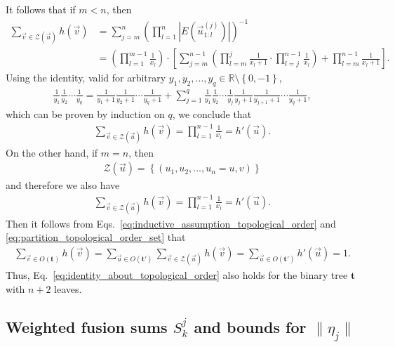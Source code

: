 \documentclass[superscriptaddress,onecolumn,nofootinbib,longbibliography,a4paper,accepted=2026-09-29]{quantumarticle}
\theoremstyle{plain}
\theoremstyle{definition}
\numberwithin{thm}{section}
\numberwithin{assumption}{section}
\numberwithin{lemma}{section}
\numberwithin{prop}{section}
\numberwithin{cor}{section}
\numberwithin{definition}{section}
\numberwithin{rmk}{section}
\numberwithin{equation}{section}
\newcommand{\R}{\mathbb{R}}
\newcommand{\lrb}[1]{\left ( #1 \right )}
\newcommand{\lrcb}[1]{\left \{ #1 \right \}}
\newcommand{\mbt}{\mathbf{t}}
\begin{document}
It follows that if $m<n$, then
\begin{align}
\sum_{\vec v \in \mathcal{Z}(\vec u)} h(\vec v)
&=\sum_{j=m}^{n} \lrb{\prod_{l=1}^n |E(\vec u^{(j)}_{1:l})|}^{-1}\\
&=    
\lrb{\prod_{l=1}^{m-1} \frac{1}{x_l}} \cdot 
\left [\sum_{j=m}^{n-1} 
\lrb{\prod_{l=m}^j \frac{1}{x_l+1} \cdot \prod_{l=j}^{n-1} \frac{1}{x_l}}  +\prod_{l=m}^{n-1}\frac{1}{x_l+1} \right ].
\end{align}
Using the identity, valid for arbitrary $y_1, y_2, \dots, y_q \in \R \setminus \lrcb{0, -1}$,
\begin{align}
\frac{1}{y_1} \frac{1}{y_2} \cdots \frac{1}{y_q}
=
\frac{1}{y_1+1} \frac{1}{y_2+1} \cdots \frac{1}{y_q+1}
+\sum_{j=1}^{q} \frac{1}{y_1} \frac{1}{y_2} \cdots \frac{1}{y_j}
\frac{1}{y_j+1}\frac{1}{y_{j+1}+1} \cdots \frac{1}{y_q+1},
\end{align}
which can be proven by induction on $q$, we conclude that
\begin{align}
\sum_{\vec v \in \mathcal{Z}(\vec u)} h(\vec v)
=\prod_{l=1}^{n-1} \frac{1}{x_l} 
=h'(\vec u).
\end{align}
On the other hand, if $m=n$, then 
\begin{align}
\mathcal{Z}(\vec u) = \lrcb{(u_1, u_2, \dots, u_n=u, v)}
\end{align}
and therefore we also have
\begin{align}
\sum_{\vec v \in \mathcal{Z}(\vec u)} h(\vec v)
=\prod_{l=1}^{n-1} \frac{1}{x_l} 
=h'(\vec u).
\end{align}
Then it follows from Eqs.~\eqref{eq:inductive_assumption_topological_order} and \eqref{eq:partition_topological_order_set} that
\begin{align}
    \sum_{\vec v \in O(\mbt)} h(\vec v)
    =   \sum_{\vec u \in O(\mbt')} \sum_{\vec v \in \mathcal{Z}(\vec u)} h(\vec v)
    =   \sum_{\vec u \in O(\mbt')}  h'(\vec u)
    = 1.
\end{align}
Thus, Eq.~\eqref{eq:identity_about_topological_order} also holds for the binary tree $\mbt$ with $n+2$ leaves.



\subsection{Weighted fusion sums\texorpdfstring{ $S_k^{j}$}{} and bounds for \texorpdfstring{$\|\eta_j\|$}{higher components of the Carleman error}}
\end{document}
